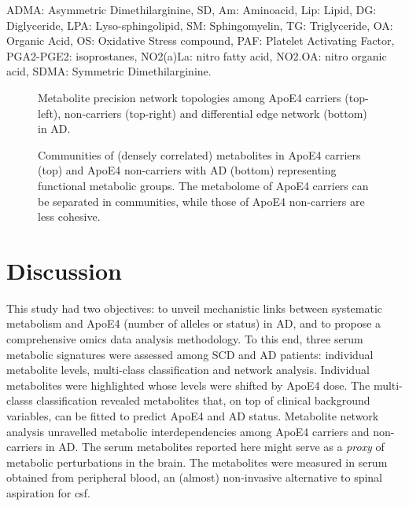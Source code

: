 \documentclass{amsart}
\begin{document}
\begin{table}[H]
\begin{threeparttable}
\begin{tabular}{lclc}
  \end{tabular}
\begin{tablenotes}
\item[] ADMA: Asymmetric Dimethilarginine, SD, Am: Aminoacid, Lip: Lipid, DG: Diglyceride, LPA: Lyso-sphingolipid, SM: Sphingomyelin, TG: Triglyceride, OA: Organic Acid, OS: Oxidative Stress compound, PAF: Platelet Activating Factor, PGA2-PGE2: isoprostanes, NO2(a)La: nitro fatty acid, NO2.OA: nitro organic acid, SDMA: Symmetric Dimethilarginine. \end{tablenotes}
\end{threeparttable}
  \end{table} \clearpage
\begin{figure}[!h]
  \centerline{}
  \caption{\label{netAD} Metabolite precision network topologies among ApoE4 carriers (top-left), non-carriers (top-right) and differential edge network (bottom) in AD.}  
  \end{figure}
\begin{figure}
  
  \caption{\label{comms} Communities of (densely correlated) metabolites in ApoE4 carriers (top) and ApoE4 non-carriers with AD (bottom) representing functional metabolic groups. The metabolome of ApoE4 carriers can be separated in communities, while those of ApoE4 non-carriers are less cohesive.}
\end{figure}

\clearpage
\section{Discussion} \label{discuss}
This study had two objectives: to unveil mechanistic links between systematic metabolism and ApoE4 (number of alleles or status) in AD, and to propose a comprehensive omics data analysis methodology. To this end, three serum metabolic signatures were assessed among SCD and AD patients: individual metabolite levels, multi-class classification and network analysis. Individual metabolites were highlighted whose levels were shifted by ApoE4 dose. The multi-classs classification revealed metabolites that, on top of clinical background variables, can be fitted to predict ApoE4 and AD status. Metabolite network analysis unravelled metabolic interdependencies among ApoE4 carriers and non-carriers in AD. The serum metabolites reported here might serve as a \textit{proxy} of metabolic perturbations in the brain. The metabolites were measured in serum obtained from peripheral blood, an (almost) non-invasive alternative to spinal aspiration for \acrshort{csf}.
\end{document}
